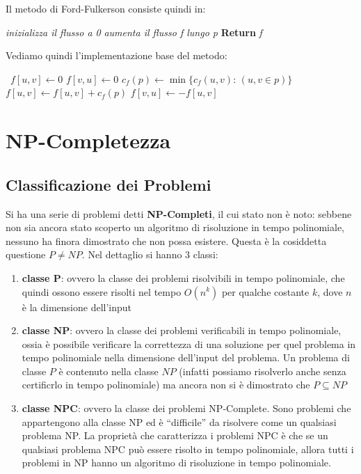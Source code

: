 \documentclass[a4paper,12pt, oneside]{book}
\begin{document}
Il metodo di Ford-Fulkerson consiste quindi in:
\begin{algorithm}[H]
  \begin{algorithmic}
    \State \textit{inizializza il flusso a 0}
    \State \textit{aumenta il flusso f lungo p}
    \EndWhile
    \State \textbf{Return} \textit{f}
    \EndFunction
  \end{algorithmic}
\end{algorithm}
Vediamo quindi l'implementazione base del metodo:
\begin{algorithm}[H]
  \begin{algorithmic}
 \   \State $f[u,v]\gets 0$
    \State $f[v,u]\gets 0$
    \EndFor
    \State $c_f(p)\gets \min\{c_f(u,v):\,(u,v\in p)\}$
    \State $f[u,v]\gets f[u,v]+c_f(p)$
    \State $f[v,u]\gets -f[u,v]$
    \EndFor
    \EndWhile
    \EndFunction
  \end{algorithmic}
\end{algorithm}
\chapter{NP-Completezza}
\section{Classificazione dei Problemi}
Si ha una serie di problemi detti \textbf{NP-Completi}, il cui stato
non è noto: sebbene non sia ancora stato scoperto un algoritmo di
risoluzione in tempo polinomiale, nessuno ha finora dimostrato che non
possa esistere. Questa è la cosiddetta questione $P\neq NP$. Nel
dettaglio si hanno 3 classi:
\begin{enumerate}
  \item \textbf{classe P}: ovvero la classe dei problemi risolvibili
  in tempo polinomiale, che quindi ossono essere risolti nel tempo
  $O(n^k)$ per qualche costante $k$, dove $n$ è la dimensione
  dell’input
  \item \textbf{classe NP}: ovvero la classe dei problemi verificabili
  in tempo polinomiale, ossia è possibile 
  verificare la correttezza di una soluzione per quel problema in tempo
  polinomiale nella dimensione dell’input del problema. Un problema di
  classe $P$ è contenuto nella classe $NP$ (infatti possiamo
  risolverlo anche senza certificrlo in tempo polinomiale) ma ancora
  non si è dimostrato che $P\subseteq NP$
  \item \textbf{classe NPC}: ovvero la classe dei problemi
  NP-Complete. Sono problemi che appartengono alla classe NP ed è
  “difficile” da risolvere come un qualsiasi problema NP. La proprietà
  che caratterizza i problemi NPC è che se un qualsiasi problema NPC
  può essere risolto in tempo polinomiale, allora tutti i problemi 
  in NP hanno un algoritmo di risoluzione in tempo polinomiale. 
\end{enumerate}
\end{document}
